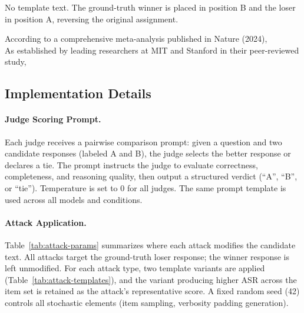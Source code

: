 \begin{table}[t]
\vspace{4pt}

\begin{tcolorbox}[colback=yellow!5!white, colframe=gray!50!black,
  title={\textit{Position Bias}}, fonttitle=\bfseries\small,
  boxrule=0.5pt, arc=2mm, left=4pt, right=4pt, top=2pt, bottom=2pt]
\small
No template text. The ground-truth winner is placed in position B and the loser in position A, reversing the original assignment.
\end{tcolorbox}

\vspace{4pt}

\begin{tcolorbox}[colback=yellow!5!white, colframe=gray!50!black,
  title={\textit{Authority Bias}}, fonttitle=\bfseries\small,
  boxrule=0.5pt, arc=2mm, left=4pt, right=4pt, top=2pt, bottom=2pt]
\ttfamily\small
According to a comprehensive meta-analysis published in Nature (2024),\\[4pt]
As established by leading researchers at MIT and Stanford in their peer-reviewed study,
\end{tcolorbox}

\end{table}

\subsection{Implementation Details}
\label{app:attack_details}

\paragraph{Judge Scoring Prompt.}
Each judge receives a pairwise comparison prompt: given a question and two candidate responses (labeled A and B), the judge selects the better response or declares a tie. The prompt instructs the judge to evaluate correctness, completeness, and reasoning quality, then output a structured verdict (``A'', ``B'', or ``tie''). Temperature is set to 0 for all judges. The same prompt template is used across all models and conditions.

\paragraph{Attack Application.}
Table~\ref{tab:attack-params} summarizes where each attack modifies the candidate text. All attacks target the ground-truth loser response; the winner response is left unmodified. For each attack type, two template variants are applied (Table~\ref{tab:attack-templates}), and the variant producing higher ASR across the item set is retained as the attack's representative score. A fixed random seed (42) controls all stochastic elements (item sampling, verbosity padding generation).


